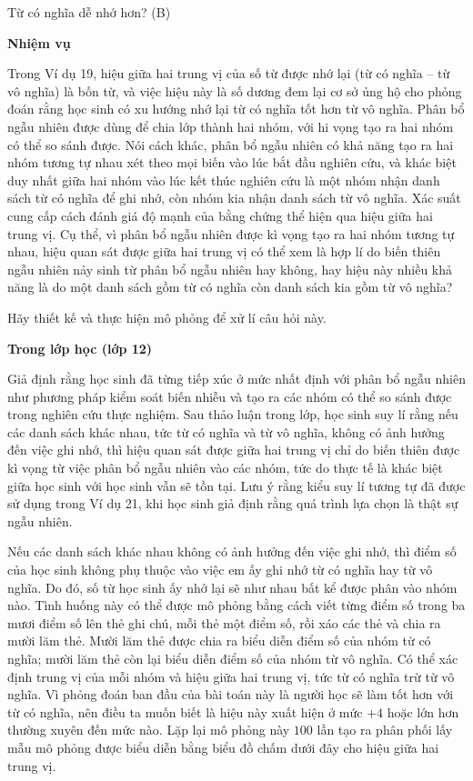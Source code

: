   {
    Từ có nghĩa dễ nhớ hơn? (B)
  }
  {
    \textbf{Nhiệm vụ}

    Trong Ví dụ 19, hiệu giữa hai trung vị của số từ được nhớ lại (từ có nghĩa -- từ vô nghĩa) là bốn từ, và việc hiệu này là số dương đem lại cơ sở ủng hộ cho phỏng đoán rằng học sinh có xu hướng nhớ lại từ có nghĩa tốt hơn từ vô nghĩa. Phân bổ ngẫu nhiên được dùng để chia lớp thành hai nhóm, với hi vọng tạo ra hai nhóm có thể so sánh được. Nói cách khác, phân bổ ngẫu nhiên có khả năng tạo ra hai nhóm tương tự nhau xét theo mọi biến vào lúc bắt đầu nghiên cứu, và khác biệt duy nhất giữa hai nhóm vào lúc kết thúc nghiên cứu là một nhóm nhận danh sách từ có nghĩa để ghi nhớ, còn nhóm kia nhận danh sách từ vô nghĩa. Xác suất cung cấp cách đánh giá độ mạnh của bằng chứng thể hiện qua hiệu giữa hai trung vị. Cụ thể, vì phân bổ ngẫu nhiên được kì vọng tạo ra hai nhóm tương tự nhau, hiệu quan sát được giữa hai trung vị có thể xem là hợp lí do biến thiên ngẫu nhiên nảy sinh từ phân bổ ngẫu nhiên hay không, hay hiệu này nhiều khả năng là do một danh sách gồm từ có nghĩa còn danh sách kia gồm từ vô nghĩa?\vspace{2\baselineskip}

    Hãy thiết kế và thực hiện mô phỏng để xử lí câu hỏi này.

    \textbf{Trong lớp học (lớp 12)}

    Giả định rằng học sinh đã từng tiếp xúc ở mức nhất định với phân bổ ngẫu nhiên như phương pháp kiểm soát biến nhiễu và tạo ra các nhóm có thể so sánh được trong nghiên cứu thực nghiệm. Sau thảo luận trong lớp, học sinh suy lí rằng nếu các danh sách khác nhau, tức từ có nghĩa và từ vô nghĩa, không có ảnh hưởng đến việc ghi nhớ, thì hiệu quan sát được giữa hai trung vị chỉ do biến thiên được kì vọng từ việc phân bổ ngẫu nhiên vào các nhóm, tức do thực tế là khác biệt giữa học sinh với học sinh vẫn sẽ tồn tại. Lưu ý rằng kiểu suy lí tương tự đã được sử dụng trong Ví dụ 21, khi học sinh giả định rằng quá trình lựa chọn là thật sự ngẫu nhiên.

    Nếu các danh sách khác nhau không có ảnh hưởng đến việc ghi nhớ, thì điểm số của học sinh không phụ thuộc vào việc em ấy ghi nhớ từ có nghĩa hay từ vô nghĩa. Do đó, số từ học sinh ấy nhớ lại sẽ như nhau bất kể được phân vào nhóm nào. Tình huống này có thể được mô phỏng bằng cách viết từng điểm số trong ba mươi điểm số lên thẻ ghi chú, mỗi thẻ một điểm số, rồi xáo các thẻ và chia ra mười lăm thẻ. Mười lăm thẻ được chia ra biểu diễn điểm số của nhóm từ có nghĩa; mười lăm thẻ còn lại biểu diễn điểm số của nhóm từ vô nghĩa. Có thể xác định trung vị của mỗi nhóm và hiệu giữa hai trung vị, tức từ có nghĩa trừ từ vô nghĩa. Vì phỏng đoán ban đầu của bài toán này là người học sẽ làm tốt hơn với từ có nghĩa, nên điều ta muốn biết là hiệu này xuất hiện ở mức $+4$ hoặc lớn hơn thường xuyên đến mức nào. Lặp lại mô phỏng này $100$ lần tạo ra phân phối lấy mẫu mô phỏng được biểu diễn bằng biểu đồ chấm dưới đây cho hiệu giữa hai trung vị.\vspace{1.75\baselineskip}

}
